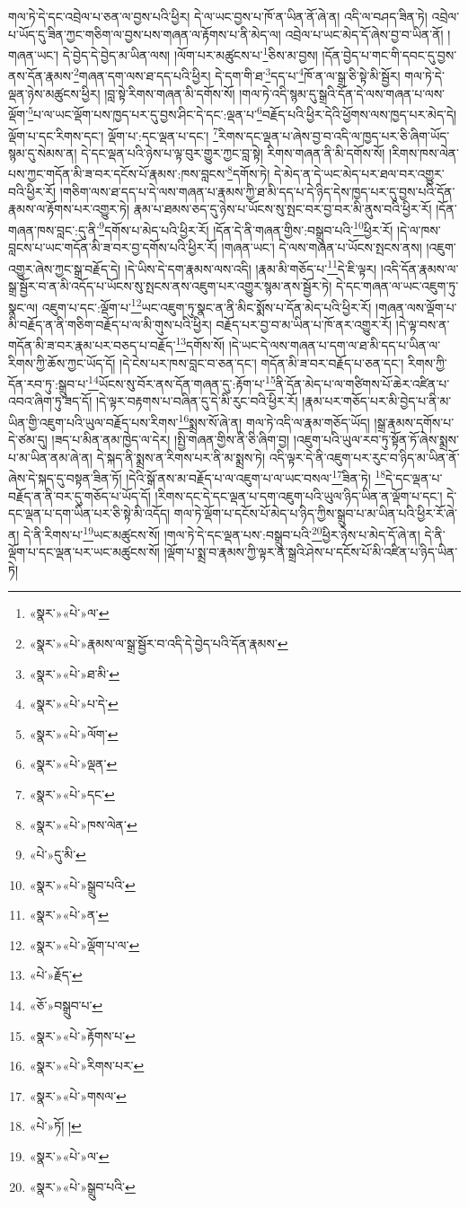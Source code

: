 གལ་ཏེ་དེ་དང་འབྲེལ་པ་ཅན་ལ་བྱས་པའི་ཕྱིར། དེ་ལ་ཡང་བྱས་པ་ཁོ་ན་ཡིན་ནོ་ཞེ་ན། འདི་ལ་བཤད་ཟིན་ཏེ། འབྲེལ་པ་ཡོད་དུ་ཟིན་ཀྱང་གཅིག་ལ་བྱས་པས་གཞན་ལ་རྟོགས་པ་ནི་མེད་ལ། འབྲེལ་པ་ཡང་མེད་དོ་ཞེས་བྱ་བ་ཡིན་ནོ། །གཞན་ཡང་། དེ་བྱེད་དེ་བྱེད་མ་ཡིན་ལས། །ལོག་པར་མཚུངས་པ་\footnote{«སྣར་»«པེ་»ལ་}ཅིས་མ་བྱས། །དོན་བྱེད་པ་གང་གི་དབང་དུ་བྱས་ནས་དོན་རྣམས་\footnote{«སྣར་»«པེ་»རྣམས་ལ་སྒྲ་སྦྱོར་བ་འདི་དེ་བྱེད་པའི་དོན་རྣམས་}གཞན་དག་ལས་ཐ་དད་པའི་ཕྱིར། དེ་དག་གི་ཐ་\footnote{«སྣར་»«པེ་»ཐ་མི་}དད་པ་\footnote{«སྣར་»«པེ་»པ་དེ་}ཁོ་ན་ལ་སྒྲ་ཅི་སྟེ་མི་སྦྱོར། གལ་ཏེ་དེ་ལྡན་ཉེས་མཚུངས་ཕྱིར། །བླ་སྟེ་རིགས་གཞན་མི་དགོས་སོ། །གལ་ཏེ་འདི་སྙམ་དུ་སྒྲའི་དོན་དེ་ལས་གཞན་པ་ལས་ལྡོག་\footnote{«སྣར་»«པེ་»ལོག་}པ་ལ་ཡང་ལྡོག་པས་ཁྱད་པར་དུ་བྱས་ཤིང་དེ་དང་:ལྡན་པ་\footnote{«སྣར་»«པེ་»ལྡན་}བརྗོད་པའི་ཕྱིར་དེའི་ཕྱོགས་ལས་ཁྱད་པར་མེད་དེ། ལྡོག་པ་དང་རིགས་དང་། ལྡོག་པ་:དང་ལྡན་པ་དང་། \footnote{«སྣར་»«པེ་»དང་}རིགས་དང་ལྡན་པ་ཞེས་བྱ་བ་འདི་ལ་ཁྱད་པར་ཅི་ཞིག་ཡོད་སྙམ་དུ་སེམས་ན། དེ་དང་ལྡན་པའི་ཉེས་པ་ལྟ་བུར་གྱུར་ཀྱང་བླ་སྟེ། རིགས་གཞན་ནི་མི་དགོས་སོ། །རིགས་ཁས་ལེན་པས་ཀྱང་གདོན་མི་ཟ་བར་དངོས་པོ་རྣམས་:ཁས་བླངས་\footnote{«སྣར་»«པེ་»ཁས་ལེན་}དགོས་ཏེ། དེ་མེད་ན་དེ་ཡང་མེད་པར་ཐལ་བར་འགྱུར་བའི་ཕྱིར་རོ། །གཅིག་ལས་ཐ་དད་པ་དེ་ལས་གཞན་པ་རྣམས་ཀྱི་ཐ་མི་དད་པ་དེ་ཉིད་དེས་ཁྱད་པར་དུ་བྱས་པའི་དོན་རྣམས་ལ་རྟོགས་པར་འགྱུར་ཏེ། རྣམ་པ་ཐམས་ཅད་དུ་ཉེས་པ་ཡོངས་སུ་སྤང་བར་བྱ་བར་མི་ནུས་བའི་ཕྱིར་རོ། །དོན་གཞན་ཁས་བླང་:དུ་ནི་\footnote{«པེ་»དུ་མི་}དགོས་པ་མེད་པའི་ཕྱིར་རོ། །དོན་དེ་ནི་གཞན་གྱིས་:བསྒྲུབ་པའི་\footnote{«སྣར་»«པེ་»སྒྲུབ་པའི་}ཕྱིར་རོ། །དེ་ལ་ཁས་བླངས་པ་ཡང་གདོན་མི་ཟ་བར་བྱ་དགོས་པའི་ཕྱིར་རོ། །གཞན་ཡང་། དེ་ལས་གཞན་པ་ཡོངས་སྤངས་ནས། །འཇུག་འགྱུར་ཞེས་ཀྱང་སྒྲ་བརྗོད་དེ། །དེ་ཡིས་དེ་དག་རྣམས་ལས་འདི། །རྣམ་མི་གཅོད་པ་\footnote{«སྣར་»«པེ་»ན་}དེ་ཇི་ལྟར། །འདི་དོན་རྣམས་ལ་སྒྲ་སྦྱོར་བ་ན་མི་འདོད་པ་ཡོངས་སུ་སྤངས་ནས་འཇུག་པར་འགྱུར་སྙམ་ནས་སྦྱོར་ཏེ། དེ་དང་གཞན་ལ་ཡང་འཇུག་ཏུ་སྣང་ལ། འཇུག་པ་དང་:ལྡོག་པ་\footnote{«སྣར་»«པེ་»ལྡོག་པ་ལ་}ཡང་འཇུག་ཏུ་སྣང་ན་ནི་མིང་སྨོས་པ་དོན་མེད་པའི་ཕྱིར་རོ། །གཞན་ལས་ལྡོག་པ་མི་བརྗོད་ན་ནི་གཅིག་བརྗོད་པ་ལ་མི་གུས་པའི་ཕྱིར། བརྗོད་པར་བྱ་བ་མ་ཡིན་པ་ཁོ་ནར་འགྱུར་རོ། །དེ་ལྟ་བས་ན་གདོན་མི་ཟ་བར་རྣམ་པར་བཅད་པ་བརྗོད་\footnote{«པེ་»རྗོད་}དགོས་སོ། །དེ་ཡང་དེ་ལས་གཞན་པ་དག་ལ་ཐ་མི་དད་པ་ཡིན་ལ་རིགས་ཀྱི་ཆོས་ཀྱང་ཡོད་དོ། །དེ་ངེས་པར་ཁས་བླང་བ་ཅན་དང་། གདོན་མི་ཟ་བར་བརྗོད་པ་ཅན་དང་། རིགས་ཀྱི་དོན་རབ་ཏུ་:སྒྲུབ་པ་\footnote{«ཅོ་»བསྒྲུབ་པ་}ཡོངས་སུ་བོར་ནས་དོན་གཞན་དུ་:རྟོག་པ་\footnote{«སྣར་»«པེ་»རྟོགས་པ་}ནི་དོན་མེད་པ་ལ་གཙིགས་པོ་ཆེར་འཛིན་པ་འབའ་ཞིག་ཏུ་ཟད་དོ། །དེ་ལྟར་བརྟགས་པ་བཞིན་དུ་དེ་མི་རུང་བའི་ཕྱིར་རོ། །རྣམ་པར་གཅོད་པར་མི་བྱེད་པ་ནི་མ་ཡིན་གྱི་འཇུག་པའི་ཡུལ་བརྗོད་པས་རིགས་\footnote{«སྣར་»«པེ་»རིགས་པར་}སྨྲས་སོ་ཞེ་ན། གལ་ཏེ་འདི་ལ་རྣམ་གཅོད་ཡོད། །སྒྲ་རྣམས་དགོས་པ་དེ་ཙམ་དུ། །ཟད་པ་མིན་ནམ་ཁྱེད་ལ་དེར། །སྤྱི་གཞན་གྱིས་ནི་ཅི་ཞིག་བྱ། །འཇུག་པའི་ཡུལ་རབ་ཏུ་སྟོན་ཏོ་ཞེས་སྨྲས་པ་མ་ཡིན་ནམ་ཞེ་ན། དེ་སྐད་ནི་སྨྲས་ན་རིགས་པར་ནི་མ་སྨྲས་ཏེ། འདི་ལྟར་དེ་ནི་འཇུག་པར་རུང་བ་ཉིད་མ་ཡིན་ནོ་ཞེས་དེ་སྐད་དུ་བསྟན་ཟིན་ཏོ། །དེའི་སྒོ་ནས་མ་བརྗོད་པ་ལ་འཇུག་པ་ལ་ཡང་བསལ་\footnote{«སྣར་»«པེ་»གསལ་}ཟིན་ཏེ། \footnote{«པེ་»ཏོ། ། }དེ་དང་ལྡན་པ་བརྗོད་ན་ནི་བར་དུ་གཅོད་པ་ཡོད་དོ། །རིགས་དང་དེ་དང་ལྡན་པ་དག་འཇུག་པའི་ཡུལ་ཉིད་ཡིན་ན་ལྡོག་པ་དང་། དེ་དང་ལྡན་པ་དག་ཡིན་པར་ཅི་སྟེ་མི་འདོད། གལ་ཏེ་ལྡོག་པ་དངོས་པོ་མེད་པ་ཉིད་ཀྱིས་སྒྲུབ་པ་མ་ཡིན་པའི་ཕྱིར་རོ་ཞེ་ན། དེ་ནི་རིགས་པ་\footnote{«སྣར་»«པེ་»ལ་}ཡང་མཚུངས་སོ། །གལ་ཏེ་དེ་དང་ལྡན་པས་:བསྒྲུབ་པའི་\footnote{«སྣར་»«པེ་»སྒྲུབ་པའི་}ཕྱིར་ཉེས་པ་མེད་དོ་ཞེ་ན། དེ་ནི་ལྡོག་པ་དང་ལྡན་པར་ཡང་མཚུངས་སོ། །ལྡོག་པ་སྨྲ་བ་རྣམས་ཀྱི་ལྟར་ན་སྒྲའི་ཤེས་པ་དངོས་པོ་མི་འཛིན་པ་ཉིད་ཡིན་ཏེ། 